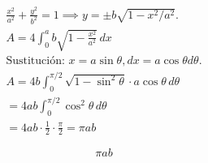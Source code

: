 

\nopagebreak
\begin{align*}
\frac{x^2}{a^2} + \frac{y^2}{b^2} = 1 \implies y = \pm b\sqrt{1 - x^2/a^2}. \\
A = 4 \int_{0}^{a} b\sqrt{1 - \frac{x^2}{a^2}} \, dx \\
\text{Sustitución: } x = a\sin\theta, dx = a\cos\theta d\theta. \\
A = 4b \int_{0}^{\pi/2} \sqrt{1-\sin^2\theta} \cdot a\cos\theta \, d\theta \\
= 4ab \int_{0}^{\pi/2} \cos^2\theta \, d\theta \\
= 4ab \cdot \frac{1}{2} \cdot \frac{\pi}{2} = \pi ab
\end{align*}

\[
\boxed{\displaystyle \pi ab}
\]
